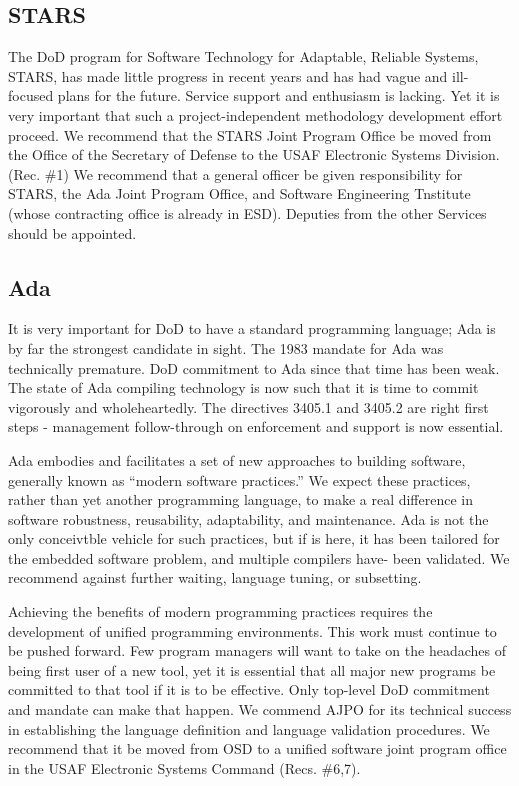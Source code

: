 \documentclass[11pt,final]{article}
\begin{document}
\subsection*{STARS}

The DoD program for Software Technology for Adaptable, Reliable Systems,
STARS, has made little progress in recent years and has had vague and
ill-focused plans for the future. Service support and enthusiasm is lacking.
Yet it is very important that such a project-independent methodology
development effort proceed. We recommend that the STARS Joint Program Office
be moved from the Office of the Secretary of Defense to the USAF Electronic
Systems Division. (Rec. \#1) We recommend that a general officer be given
responsibility for STARS, the Ada Joint Program Office, and Software
Engineering Tnstitute (whose contracting office is already in ESD). Deputies
from the other Services should be appointed.

\subsection*{Ada}

It is very important for DoD to have a standard programming language; Ada is
by far the strongest candidate in sight. The 1983 mandate for Ada was
technically premature. DoD commitment to Ada since that time has been weak.
The state of Ada compiling technology is now such that it is time to commit
vigorously and wholeheartedly.  The directives 3405.1 and 3405.2 are right
first steps - management follow-through on enforcement and support is now
essential.

Ada embodies and facilitates a set of new approaches to building software,
generally known as “modern software practices.” We expect these practices,
rather than yet another programming language, to make a real difference in
software robustness, reusability, adaptability, and maintenance. Ada is not
the only conceivtble vehicle for such practices, but if is here, it has been
tailored for the embedded software problem, and multiple compilers have- been
validated. We recommend against further waiting, language tuning, or
subsetting.

Achieving the benefits of modern programming practices requires the development of
unified programming environments. This work must continue to be pushed forward.
Few program managers will want to take on the headaches of being first user of a new
tool, yet it is essential that all major new programs be committed to that tool if it is to
be effective. Only top-level DoD commitment and mandate can make that happen.
We commend AJPO for its technical success in establishing the language definition and
language validation procedures. We recommend that it be moved from OSD to a unified
software joint program office in the USAF Electronic Systems Command (Recs. \#6,7).
\end{document}
